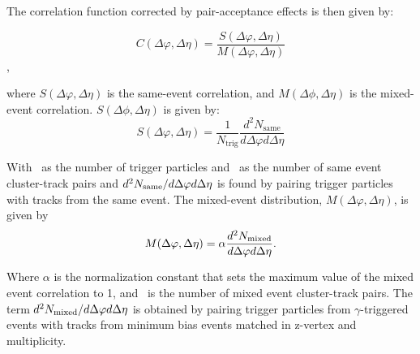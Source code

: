 The correlation function corrected by pair-acceptance effects is then given by:

\begin{equation}
\label{eq:Y}
C(\Delta \varphi, \Delta \eta) = \frac{S(\Delta \varphi, \Delta \eta)}{M(\Delta \varphi, \Delta \eta)}
\end{equation}, 

where $S(\Delta \varphi, \Delta \eta)$ is the same-event correlation, and $M(\Delta \phi, \Delta \eta)$ is the mixed-event correlation. $S(\Delta \phi, \Delta \eta)$ is given by: 
\begin{equation}
S(\Delta \varphi, \Delta \eta) = \frac{1}{N_{\mathrm{trig}}}\frac{d^2N_{\mathrm{same}}}{d\Delta \varphi d\Delta \eta}
\end{equation}

With \Ntrig~as the number of trigger particles and \Nsame~as the number of same event cluster-track pairs and $d^2N_{\mathrm{same}}/d\Delta \varphi d\Delta \eta$ is found by pairing trigger particles with tracks from the same event. The mixed-event distribution, $M(\Delta \varphi, \Delta \eta)$, is given by 
\begin{equation}
M(\Delta \varphi, \Delta \eta) = \alpha \frac{d^2 N_{\mathrm{mixed}}}{d\Delta \varphi d\Delta \eta}.
\end{equation}

Where $\alpha$ is the normalization constant that sets the maximum value of the mixed event correlation to 1, and \Nmixed~is the number of mixed event cluster-track pairs. The term $d^2 N_{\mathrm{mixed}}/d\Delta \varphi d\Delta \eta$ is obtained by pairing trigger particles from \(\gamma\)-triggered events with tracks from minimum bias events matched in z-vertex and multiplicity.


